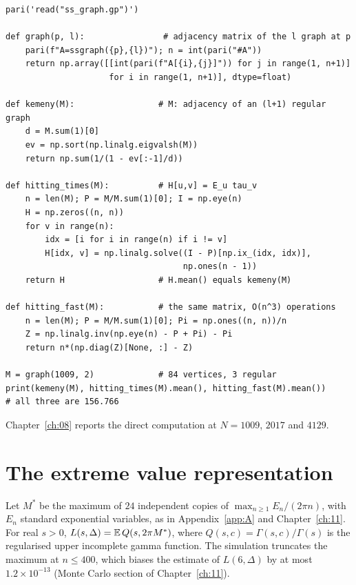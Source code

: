 {\footnotesize
\begin{verbatim}
pari('read("ss_graph.gp")')

def graph(p, l):                # adjacency matrix of the l graph at p
    pari(f"A=ssgraph({p},{l})"); n = int(pari("#A"))
    return np.array([[int(pari(f"A[{i},{j}]")) for j in range(1, n+1)]
                     for i in range(1, n+1)], dtype=float)

def kemeny(M):                 # M: adjacency of an (l+1) regular graph
    d = M.sum(1)[0]
    ev = np.sort(np.linalg.eigvalsh(M))
    return np.sum(1/(1 - ev[:-1]/d))

def hitting_times(M):          # H[u,v] = E_u tau_v
    n = len(M); P = M/M.sum(1)[0]; I = np.eye(n)
    H = np.zeros((n, n))
    for v in range(n):
        idx = [i for i in range(n) if i != v]
        H[idx, v] = np.linalg.solve((I - P)[np.ix_(idx, idx)],
                                    np.ones(n - 1))
    return H                   # H.mean() equals kemeny(M)

def hitting_fast(M):           # the same matrix, O(n^3) operations
    n = len(M); P = M/M.sum(1)[0]; Pi = np.ones((n, n))/n
    Z = np.linalg.inv(np.eye(n) - P + Pi) - Pi
    return n*(np.diag(Z)[None, :] - Z)

M = graph(1009, 2)             # 84 vertices, 3 regular
print(kemeny(M), hitting_times(M).mean(), hitting_fast(M).mean())
# all three are 156.766
\end{verbatim}
}

Chapter~\ref{ch:08} reports the direct computation at $N=1009$, $2017$ and $4129$.

\section{The extreme value representation}

Let $M^*$ be the maximum of $24$ independent copies of $\max_{n\ge1}E_n/(2\pi n)$, with $E_n$ standard exponential variables, as in Appendix~\ref{app:A} and Chapter~\ref{ch:11}. For real $s>0$, $L(s,\Delta)=\mathbb{E}\,Q(s,2\pi M^*)$, where $Q(s,c)=\Gamma(s,c)/\Gamma(s)$ is the regularised upper incomplete gamma function. The simulation truncates the maximum at $n\le400$, which biases the estimate of $L(6,\Delta)$ by at most $1.2\times10^{-13}$ (Monte Carlo section of Chapter~\ref{ch:11}).

